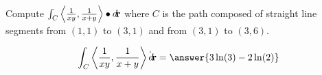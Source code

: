 \documentclass{ximera}
\author{David Guichard \and Neal Koblitz \and H. Jerome Keisler \and Albert Scheller \and Barry Balof \and Mike Wills \and Matthew Carr}
\begin{document}
\begin{exercise}




Compute $\int_C \left\langle \frac{1}{xy},\frac{1}{x+y}\right\rangle\bullet\mathop{}\!d\!\mathbf{r}$ where $C$ is the path composed of straight line segments from $(1,1)$ to $(3,1)$ and from $(3,1)$ to $(3,6)$.

\begin{prompt}
\[
\int_C \vector{\frac{1}{xy},\frac{1}{x+y}}\dot\d\vec{r}=\answer{3\ln(3)-2\ln(2)}
\]
\end{prompt}



\end{exercise}
\end{document}
